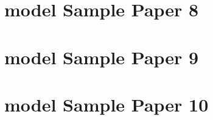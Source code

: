\documentclass[
  letterpaper,
  DIV=11,
  numbers=noendperiod]{scrreprt}
\begin{document}
\hypertarget{model-sample-paper-8-1}{%
\section*{model Sample Paper 8}\label{model-sample-paper-8-1}}


\hypertarget{model-sample-paper-9-1}{%
\section*{model Sample Paper 9}\label{model-sample-paper-9-1}}


\hypertarget{model-sample-paper-10-1}{%
\section*{model Sample Paper 10}\label{model-sample-paper-10-1}}

\end{document}
